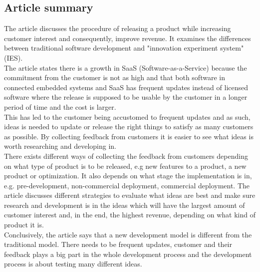 \documentclass[12pt]{article}
\begin{document}
\subsection{Article summary}
The article discusses the procedure of releasing a product while increasing customer interest and consequently, improve revenue. It examines the differences between traditional software development and "innovation experiment system" (IES).\\
The article states there is a growth in SaaS (Software-as-a-Service) because the commitment from the customer is not as high and that both software in connected embedded systems and SaaS has frequent updates instead of licensed software where the release is supposed to be usable by the customer in a longer period of time and the cost is larger.\\
This has led to the customer being accustomed to frequent updates and as such, ideas is needed to update or release the right things to satisfy as many customers as possible. By collecting feedback from customers it is easier to see what ideas is worth researching and developing in.\\
There exists different ways of collecting the feedback from customers depending on what type of product is to be released, e.g new features to a product, a new product or optimization. It also depends on what stage the implementation is in, e.g. pre-development, non-commercial deployment, commercial deployment. The article discusses different strategies to evaluate what ideas are best and make sure research and development is in the ideas which will have the largest amount of customer interest and, in the end, the highest revenue, depending on what kind of product it is.\\
Conclusively, the article says that a new development model is different from the traditional model. There needs to be frequent updates, customer and their feedback plays a big part in the whole development process and the development process is about testing many different ideas.
\end{document}
